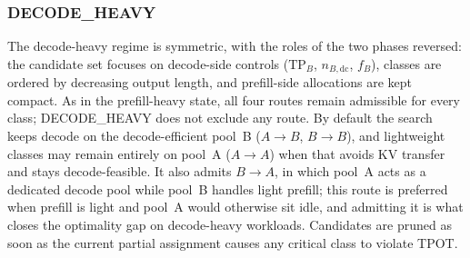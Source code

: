 \subsubsection*{\textnormal{ DECODE\_HEAVY}}
The decode-heavy regime is symmetric, with the roles of the two phases reversed: the candidate set focuses on decode-side controls ($\mathrm{TP}_B$, $n_{B,\mathrm{dc}}$, $f_B$), classes are ordered by decreasing output length, and prefill-side allocations are kept compact.
As in the prefill-heavy state, all four routes remain admissible for every class; DECODE\_HEAVY does not exclude any route.
By default the search keeps decode on the decode-efficient pool~B ($A{\to}B$, $B{\to}B$), and lightweight classes may remain entirely on pool~A ($A{\to}A$) when that avoids KV transfer and stays decode-feasible.
It also admits $B{\to}A$, in which pool~A acts as a dedicated decode pool while pool~B handles light prefill; this route is preferred when prefill is light and pool~A would otherwise sit idle, and admitting it is what closes the optimality gap on decode-heavy workloads.
Candidates are pruned as soon as the current partial assignment causes any critical class to violate TPOT.

